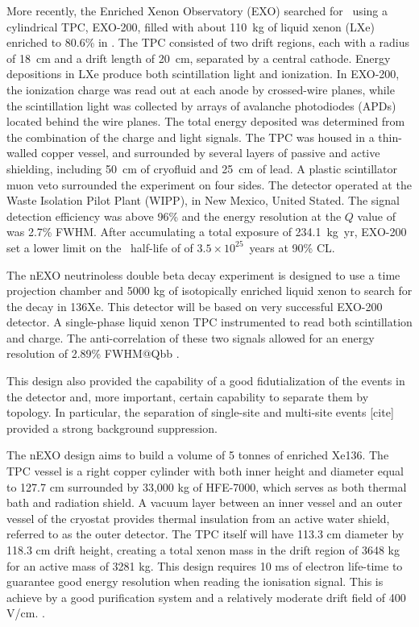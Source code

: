 More recently, the Enriched Xenon Observatory (EXO) searched for \bbonu\ using a cylindrical TPC, EXO-200, filled with about 110~kg of liquid xenon (LXe) enriched to 80.6\% in  \cite{EXO-200:2019rkq}. The TPC consisted of two drift regions, each with a radius of 18~cm and a drift length of 20~cm, separated by a central cathode. Energy depositions in LXe produce both scintillation light and ionization. In EXO-200, the ionization charge was read out at each anode by crossed-wire planes, while the scintillation light was collected by arrays of avalanche photodiodes (APDs) located behind the wire planes. The total energy deposited was determined from the combination of the charge and light signals. The TPC was housed in a thin-walled copper vessel, and surrounded by several layers of passive and active shielding, including 50~cm of cryofluid and 25~cm of lead. A plastic scintillator muon veto surrounded the experiment on four sides. The detector operated at the Waste Isolation Pilot Plant (WIPP), in New Mexico, United Stated. The signal detection efficiency was above 96\% and the energy resolution at the $Q$ value of  was 2.7\% FWHM. After accumulating a total exposure of 234.1~kg~yr, EXO-200 set a lower limit on the \bbonu\ half-life of  of $3.5\times10^{25}$~years at 90\% CL.


The nEXO neutrinoless double beta decay experiment is designed to use a time projection chamber and 5000 kg of isotopically enriched liquid xenon to search for the decay in 136Xe. This detector will be based on very successful EXO-200 detector. A single-phase liquid xenon TPC instrumented to read both scintillation and charge. The anti-correlation of these two signals allowed for an energy resolution of 2.89\% FWHM@Qbb \cite{EXO-200:2020wmu}.

This design also provided the capability of a good fidutialization of the events in the detector and, more important, certain capability to separate them by topology. In particular, the separation of single-site and multi-site events [cite] provided a strong background suppression.

The nEXO design aims to build a volume of 5 tonnes of enriched Xe136. The TPC vessel is a right copper cylinder with both inner height and diameter equal to 127.7 cm surrounded by 33,000 kg of HFE-7000, which serves as both thermal bath and radiation shield. A vacuum layer between an inner vessel and an outer vessel of the cryostat provides thermal insulation from an active water shield, referred to as the outer detector. The TPC itself will have 113.3 cm diameter by 118.3 cm drift height, creating a total xenon mass in the drift region of 3648 kg for an active mass of 3281 kg. This design requires 10 ms of electron life-time to guarantee good energy resolution when reading the ionisation signal. This is achieve by a good purification system and a relatively moderate drift field of 400 V/cm. \cite{nEXO:2021ujk}.



